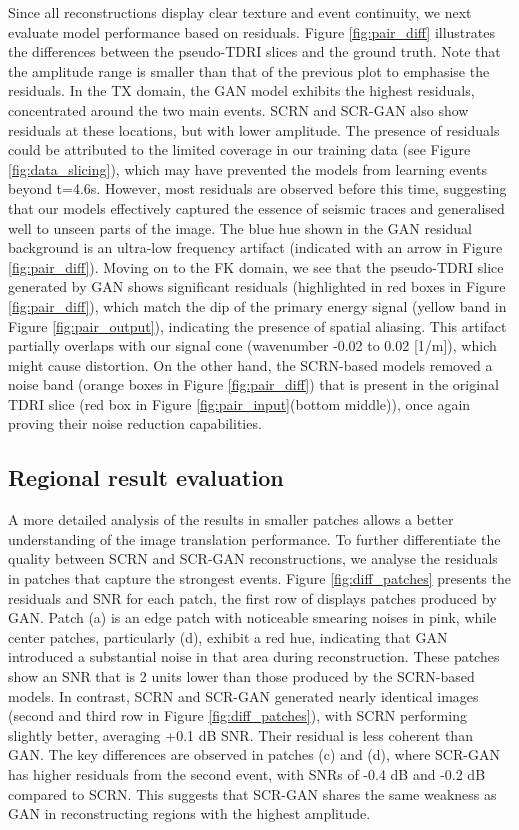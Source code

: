 \noindent Since all reconstructions display clear texture and event continuity, we next evaluate model performance based on residuals. Figure \ref{fig:pair_diff} illustrates the differences between the pseudo-TDRI slices and the ground truth. 
Note that the amplitude range is smaller than that of the previous plot to emphasise the residuals. In the TX domain, the GAN model exhibits the highest residuals, concentrated around the two main events. SCRN and SCR-GAN also show residuals at these locations, but with lower amplitude. The presence of residuals could be attributed to the limited coverage in our training data (see Figure \ref{fig:data_slicing}), which may have prevented the models from learning events beyond t=4.6s. However, most residuals are observed before this time, suggesting that our models effectively captured the essence of seismic traces and generalised well to unseen parts of the image. The blue hue shown in the GAN residual background is an ultra-low frequency artifact (indicated with an arrow in Figure \ref{fig:pair_diff}). Moving on to the FK domain, we see that the pseudo-TDRI slice generated by GAN shows significant residuals (highlighted in red boxes in Figure \ref{fig:pair_diff}), which match the dip of the primary energy signal (yellow band in Figure \ref{fig:pair_output}), indicating the presence of spatial aliasing. This artifact partially overlaps with our signal cone (wavenumber -0.02 to 0.02 [1/m]), which might cause distortion. On the other hand, the SCRN-based models removed a noise band (orange boxes in Figure \ref{fig:pair_diff}) that is present in the original TDRI slice (red box in Figure \ref{fig:pair_input}(bottom middle)), once again proving their noise reduction capabilities.

\subsection{Regional result evaluation}
\noindent  A more detailed analysis of the results in smaller patches allows a better understanding of the image translation performance. To further differentiate the quality between SCRN and SCR-GAN reconstructions, we analyse the residuals in patches that capture the strongest events. Figure \ref{fig:diff_patches} presents the residuals and SNR for each patch, the first row of  displays patches produced by GAN. Patch (a) is an edge patch with noticeable smearing noises in pink, while center patches, particularly (d), exhibit a red hue, indicating that GAN introduced a substantial noise in that area during reconstruction. These patches show an SNR that is 2 units lower than those produced by the SCRN-based models. In contrast, SCRN and SCR-GAN generated nearly identical images (second and third row in Figure \ref{fig:diff_patches}), with SCRN performing slightly better, averaging +0.1 dB SNR. Their residual is less coherent than GAN. The key differences are observed in patches (c) and (d), where SCR-GAN has higher residuals from the second event, with SNRs of -0.4 dB and -0.2 dB compared to SCRN. This suggests that SCR-GAN shares the same weakness as GAN in reconstructing regions with the highest amplitude.\\

